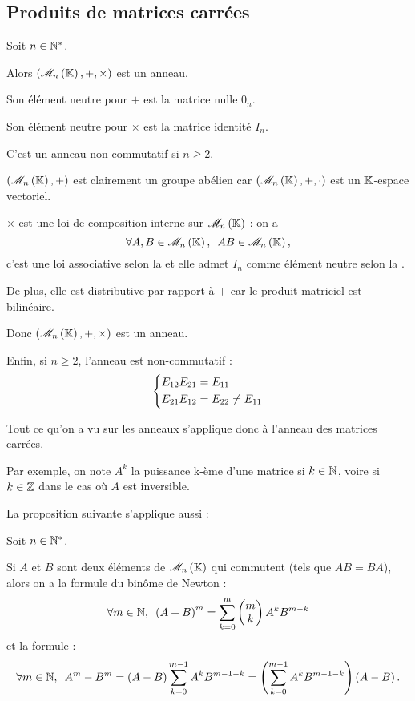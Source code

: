 \subsection{Produits de matrices carrées}

\begin{prop}
Soit \(n\in\mathbb{N}^*\).

Alors \(\anneau{\M{n}}\) est un anneau.

Son élément neutre pour \(+\) est la matrice nulle \(0_n\).

Son élément neutre pour \(\times\) est la matrice identité \(I_n\).

C'est un anneau non-commutatif si \(n\geq2\).
\end{prop}

\begin{dem}
\(\groupe{\M{n}}\) est clairement un groupe abélien car \(\anneau{\M{n}}[+][\cdot]\) est un \(\mathbb{K}\)-espace vectoriel.

\(\times\) est une loi de composition interne sur \(\M{n}\) : on a \[\quantifs{\forall A,B\in\M{n}}AB\in\M{n},\] c'est une loi associative selon la  et elle admet \(I_n\) comme élément neutre selon la .

De plus, elle est distributive par rapport à \(+\) car le produit matriciel est bilinéaire.

Donc \(\anneau{\M{n}}\) est un anneau.

Enfin, si \(n\geq2\), l'anneau est non-commutatif : \[\begin{dcases}
E_{12}E_{21}=E_{11} \\
E_{21}E_{12}=E_{22}\not=E_{11}
\end{dcases}\]
\end{dem}

\begin{rem}
Tout ce qu'on a vu sur les anneaux s'applique donc à l'anneau des matrices carrées.

Par exemple, on note \(A^k\) la puissance k-ème d'une matrice si \(k\in\mathbb{N}\), voire si \(k\in\mathbb{Z}\) dans le cas où \(A\) est inversible.

La proposition suivante s'applique aussi :
\end{rem}

\begin{prop}
Soit \(n\in\mathbb{N}^*\).

Si \(A\) et \(B\) sont deux éléments de \(\M{n}\) qui commutent (\cad tels que \(AB=BA\)), alors on a la formule du binôme de Newton : \[\quantifs{\forall m\in\N}\paren{A+B}^m=\sum_{k=0}^m\binom{k}{m}A^kB^{m-k}\] et la formule : \[\quantifs{\forall m\in\N}A^m-B^m=\paren{A-B}\sum_{k=0}^{m-1}A^kB^{m-1-k}=\paren{\sum_{k=0}^{m-1}A^kB^{m-1-k}}\paren{A-B}.\]
\end{prop}

